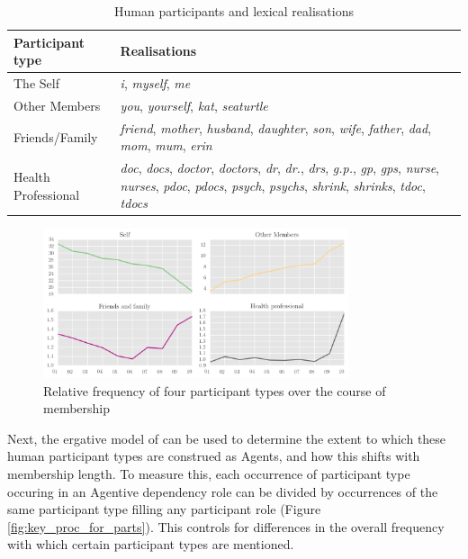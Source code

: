 \begin{table}[htb]
    \centering
    \small
    \begin{tabularx}{\textwidth}{lX}
    \toprule
    Participant type & Realisations \\ \midrule
    The Self                & \emph{i}, \emph{myself}, \emph{me}            \\
    Other Members           & \emph{you}, \emph{yourself}, \emph{kat}, \emph{seaturtle}            \\
    Friends\slash Family    & \emph{friend}, \emph{mother}, \emph{husband}, \emph{daughter}, \emph{son}, \emph{wife}, \emph{father}, \emph{dad}, \emph{mom}, \emph{mum}, \emph{erin}           \\
    Health Professional     & \emph{doc}, \emph{docs}, \emph{doctor}, \emph{doctors}, \emph{dr}, \emph{dr.}, \emph{drs}, \emph{g.p.}, \emph{gp}, \emph{gps}, \emph{nurse}, \emph{nurses}, \emph{pdoc}, \emph{pdocs}, \emph{psych}, \emph{psychs}, \emph{shrink}, \emph{shrinks}, \emph{tdoc}, \emph{tdocs}           \\ \bottomrule
    \end{tabularx}
    \caption{Human participants and lexical realisations}
    \label{tab:hum_part_lex_real}
\end{table}

\begin{figure}[htb]
    \centering
    \includegraphics[width=0.8\textwidth]{../images/part-tax-rel-freq.png}
    \caption[Frequencies for four participant types]{Relative frequency of four participant types over the course of membership}
    \label{fig:part-tax-rel-freq}
    \end{figure}

Next, the ergative model of  can be used to determine the extent to which these human participant types are construed as Agents, and how this shifts with membership length. To measure this, each occurrence of participant type occuring in an Agentive dependency role can be divided by occurrences of the same participant type filling any participant role (Figure \ref{fig:key_proc_for_parts}). This controls for differences in the overall frequency with which certain participant types are mentioned.


